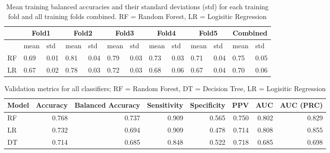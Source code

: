 \begin{table}
\centering
\begin{tabular}{lllllllllllll}
 &
  \multicolumn{2}{c}{Fold1} &
  \multicolumn{2}{c}{Fold2} &
  \multicolumn{2}{c}{Fold3} &
  \multicolumn{2}{c}{Fold4} &
  \multicolumn{2}{c}{Fold5} &
  \multicolumn{2}{c}{Combined} \\ \hline
   & mean & std  & mean & std  & mean & std  & mean & std  & mean & std  & mean 
& std  \\ \hline
RF & 0.69 & 0.01 & 0.81 & 0.04 & 0.79 & 0.03 & 0.73 & 0.03 & 0.71 & 0.04 & 0.75 
& 0.05 \\
LR & 0.67 & 0.02 & 0.78 & 0.03 & 0.72 & 0.03 & 0.68 & 0.06 & 0.67 & 0.04 & 0.70 
& 0.06
\end{tabular}
\caption{Mean training balanced accuracies and their standard deviations (std) 
for each training fold and all training folds combined. RF = Random Forest, 
LR = Logisitic Regression }
\label{tab:training-b_acc}
\end{table}
\begin{table}
\centering
\begin{tabular}{lrrrrrrr}
Model & Accuracy & Balanced Accuracy & Sensitivity & Specificity & PPV 
& AUC &  AUC (PRC) \\ \hline
   RF & 0.768 &  0.737 &        0.909 &        0.565 & 0.750 & 0.802 &        
0.829 \\
   LR & 0.732 &  0.694 &        0.909 &        0.478 & 0.714 & 0.808 &        
0.855 \\
   DT & 0.714 &  0.685 &        0.848 &        0.522 & 0.718 & 0.685 &        
0.698 \\
\end{tabular}
\caption{Validation metrics for all classifiers; RF = Random Forest, DT = 
Decision Tree, LR = Logisitic Regression}
\label{tab:validation-metrics}
\end{table}







